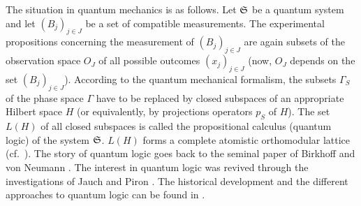 The situation in quantum mechanics is as follows.
Let ${\frak S}$ be a quantum system and let $(B_j)_{j \in J}$ be a
set of compatible measurements.
The experimental propositions concerning the measurement of
$(B_j)_{j \in J}$ are again subsets of the observation space $O_J$
of all possible outcomes $(x_j)_{j \in J}$
(now, $O_J$ depends on the set $(B_j)_{j \in J}$).
According to the quantum mechanical formalism, the subsets $\Gamma_S$
of the phase space $\Gamma$ have to be replaced by closed subspaces
of an appropriate Hilbert space $H$
(or equivalently, by projections operators $p_S$ of $H$).
The set $L(H)$ of all closed subspaces is called the propositional
calculus (quantum logic) of the system ${\frak S}$.
$L(H)$ forms a complete atomistic orthomodular lattice
(cf.~\cite{kalmbach,piziak,ptak}).
The story of quantum logic goes back to the seminal
paper of Birkhoff and von Neumann \cite{birkhoff}.
The interest in quantum logic was revived through the
investigations of Jauch \cite{jauch} and Piron \cite{piron}.
The historical development and the different approaches to quantum logic
can  be found in \cite{jammer}.

